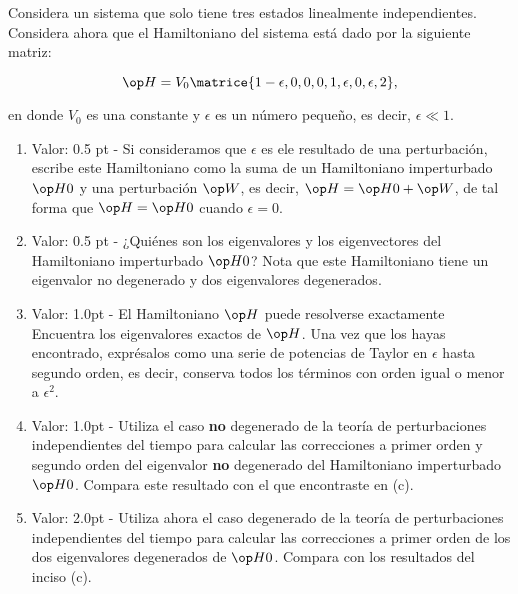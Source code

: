 \documentclass[./../main.tex]{subfiles}
\begin{document}
    \begin{exercise}
        Considera un sistema que solo tiene tres estados linealmente independientes. Considera ahora que el Hamiltoniano del sistema está dado por la siguiente matriz:

        \begin{equation*}
            \observable{H} = 
                V_{0}
                \matrice{1 - \epsilon, 0, 0, 0, 1, \epsilon, 0, \epsilon, 2},
        \end{equation*}

        en donde \(V_{0}\) es una constante y \(\epsilon\) es un número pequeño, es decir, \(\epsilon \ll 1\).

        \begin{enumerate}[label=(\alph*)]
            \item Valor: 0.5 pt - Si consideramos que \(\epsilon\) es ele resultado de una perturbación, escribe este Hamiltoniano como la suma de un Hamiltoniano imperturbado \(\observable{H}[0]\) y una perturbación \(\observable{W}\), es decir, \(\observable{H} = \observable{H}[0] + \observable{W}\), de tal forma que \(\observable{H} = \observable{H}[0]\) cuando \(\epsilon = 0\).
            \item Valor: 0.5 pt - ¿Quiénes son los eigenvalores y los eigenvectores del Hamiltoniano imperturbado \(\observable{H}[0]\)? Nota que este Hamiltoniano tiene un eigenvalor no degenerado y dos eigenvalores degenerados.
            \item Valor: 1.0pt - El Hamiltoniano \(\observable{H}\) puede resolverse exactamente Encuentra los eigenvalores exactos de \(\observable{H}\). Una vez que los hayas encontrado, exprésalos como una serie de potencias de Taylor en \(\epsilon\) hasta segundo orden, es decir, conserva todos los términos con orden igual o menor a \(\epsilon^{2}\).
            \item Valor: 1.0pt - Utiliza el caso \textbf{no} degenerado de la teoría de perturbaciones independientes del tiempo para calcular las correcciones a primer orden y segundo orden del eigenvalor \textbf{no} degenerado del Hamiltoniano imperturbado \(\observable{H}[0]\). Compara este resultado con el que encontraste en (c).
            \item Valor: 2.0pt - Utiliza ahora el caso degenerado de la teoría de perturbaciones independientes del tiempo para calcular las correcciones a primer orden de los dos eigenvalores degenerados de \(\observable{H}[0]\). Compara con los resultados del inciso (c).
        \end{enumerate}
    \end{exercise}
\end{document}
